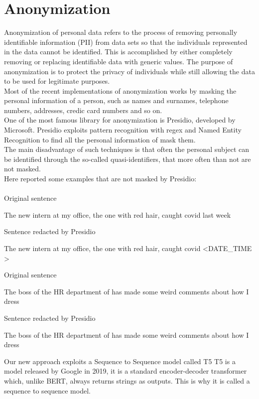\section{Anonymization}

Anonymization of personal data refers to the process of removing personally identifiable information (PII) from data sets so that the individuals represented in the data cannot be identified. This is accomplished by either completely removing or replacing identifiable data with generic values. The purpose of anonymization is to protect the privacy of individuals while still allowing the data to be used for legitimate purposes. \\
Most of the recent implementations of anonymization works by masking the personal information of a person, such as names and surnames, telephone numbers, addresses, credic card numbers and so on. \\
One of the most famous library for anonymization is Presidio, developed by Microsoft. Presidio exploits pattern recognition with regex and Named Entity Recognition to find all the personal information of mask them. \\
The main disadvantage of such techniques is that often the personal subject can be identified through the so-called quasi-identifiers, that more often than not are not masked.
\\Here reported some examples that are not masked by Presidio:\\ \\
Original sentence
\begin{adjustwidth}{1cm}{}
    The new intern at my office, the one with red hair, caught covid last week 
\end{adjustwidth}
Sentence redacted by Presidio
\begin{adjustwidth}{1cm}{}
    The new intern at my office, the one with red hair, caught covid \textless DATE\_TIME \textgreater
\end{adjustwidth}
Original sentence
\begin{adjustwidth}{1cm}{}
    The boss of the HR department of has made some weird comments about how I dress
\end{adjustwidth}
Sentence redacted by Presidio
\begin{adjustwidth}{1cm}{}
    The boss of the HR department of has made some weird comments about how I dress 
\end{adjustwidth}
Our new approach exploits a Sequence to Sequence model called T5
T5 is a model released by Google in 2019, it is a standard encoder-decoder transformer which, unlike BERT, always returns strings as outputs. This is why it is called a sequence to sequence model. \\

